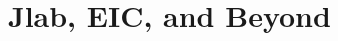 \label{Chapter-10}

\hypertarget{Section-10.1}{%
\section{Jlab, EIC, and Beyond}\label{Section-10.1}}


